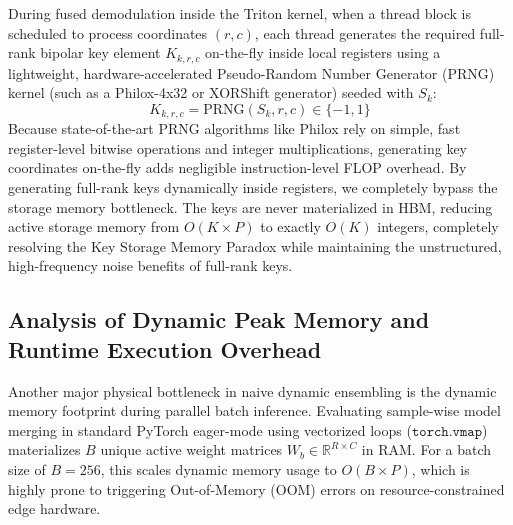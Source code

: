 \documentclass{article}
\theoremstyle{plain}
\theoremstyle{definition}
\theoremstyle{remark}
\begin{document}
During fused demodulation inside the Triton kernel, when a thread block is scheduled to process coordinates $(r, c)$, each thread generates the required full-rank bipolar key element $K_{k, r, c}$ on-the-fly inside local registers using a lightweight, hardware-accelerated Pseudo-Random Number Generator (PRNG) kernel (such as a Philox-4x32 or XORShift generator) seeded with $S_k$:
\begin{equation}
K_{k, r, c} = \text{PRNG}(S_k, r, c) \in \{-1, 1\}
\end{equation}
Because state-of-the-art PRNG algorithms like Philox rely on simple, fast register-level bitwise operations and integer multiplications, generating key coordinates on-the-fly adds negligible instruction-level FLOP overhead. By generating full-rank keys dynamically inside registers, we completely bypass the storage memory bottleneck. The keys are never materialized in HBM, reducing active storage memory from $O(K \times P)$ to exactly $O(K)$ integers, completely resolving the Key Storage Memory Paradox while maintaining the unstructured, high-frequency noise benefits of full-rank keys.

\subsection{Analysis of Dynamic Peak Memory and Runtime Execution Overhead}
\label{app:runtime_memory_analysis}

Another major physical bottleneck in naive dynamic ensembling is the dynamic memory footprint during parallel batch inference. Evaluating sample-wise model merging in standard PyTorch eager-mode using vectorized loops ($\mathtt{torch.vmap}$) materializes $B$ unique active weight matrices $W_b \in \mathbb{R}^{R \times C}$ in RAM. For a batch size of $B=256$, this scales dynamic memory usage to $O(B \times P)$, which is highly prone to triggering Out-of-Memory (OOM) errors on resource-constrained edge hardware.
\end{document}
